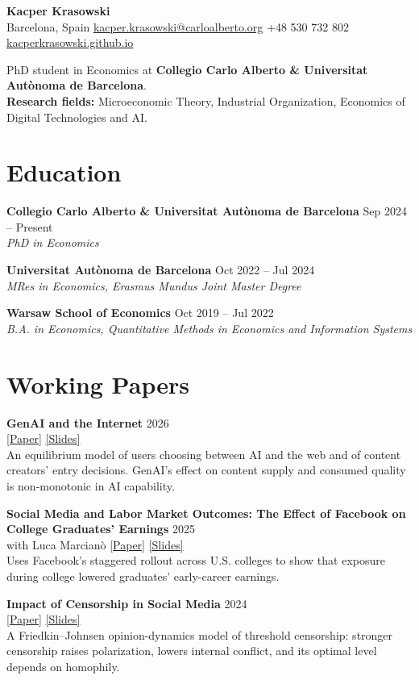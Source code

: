 \documentclass[11pt,a4paper]{article}
\newcommand{\entry}[4]{%
    \textbf{#1} \hfill #2\\
    \textit{#3}\par
    #4
    \vspace{0.6em}
}
\newcommand{\paper}[4]{%
    \textbf{#1} \hfill #2\\
    #3\\
    {\small #4}\par
    \vspace{0.6em}
}
\newcommand{\site}{https://kacperkrasowski.github.io}
\begin{document}
{\LARGE\textbf{Kacper Krasowski}}\\[0.4em]
Barcelona, Spain
\textbar{} \href{mailto:kacper.krasowski@carloalberto.org}{kacper.krasowski@carloalberto.org}
\textbar{} +48 530 732 802\\
\href{\site/}{kacperkrasowski.github.io}

\vspace{0.8em}
PhD student in Economics at \textbf{Collegio Carlo Alberto \& Universitat Aut\`onoma de Barcelona}.\\
\textbf{Research fields:} Microeconomic Theory, Industrial Organization, Economics of Digital Technologies and AI.

\section*{Education}

\entry{Collegio Carlo Alberto \& Universitat Aut\`onoma de Barcelona}{Sep 2024 -- Present}{PhD in Economics}{}

\entry{Universitat Aut\`onoma de Barcelona}{Oct 2022 -- Jul 2024}{MRes in Economics, Erasmus Mundus Joint Master Degree}{}

\entry{Warsaw School of Economics}{Oct 2019 -- Jul 2022}{B.A. in Economics, Quantitative Methods in Economics and Information Systems}{}

\section*{Working Papers}

\paper{GenAI and the Internet}{2026}{%
\href{\site/research/genaiandinternet/genaiandinternet_writeup.pdf}{[Paper]}
\href{\site/research/genaiandinternet/genaiandinternet_slides.pdf}{[Slides]}}{%
An equilibrium model of users choosing between AI and the web and of content creators' entry decisions. GenAI's effect on content supply and consumed quality is non-monotonic in AI capability.}

\paper{Social Media and Labor Market Outcomes: The Effect of Facebook on College Graduates' Earnings}{2025}{%
with Luca Marcian\`o \quad
\href{\site/research/social/social_writeup.pdf}{[Paper]}
\href{\site/research/social/social_slides.pdf}{[Slides]}}{%
Uses Facebook's staggered rollout across U.S. colleges to show that exposure during college lowered graduates' early-career earnings.}

\paper{Impact of Censorship in Social Media}{2024}{%
\href{\site/research/impact/impact_writeup.pdf}{[Paper]}
\href{\site/research/impact/impact_slides.pdf}{[Slides]}}{%
A Friedkin--Johnsen opinion-dynamics model of threshold censorship: stronger censorship raises polarization, lowers internal conflict, and its optimal level depends on homophily.}
\end{document}

